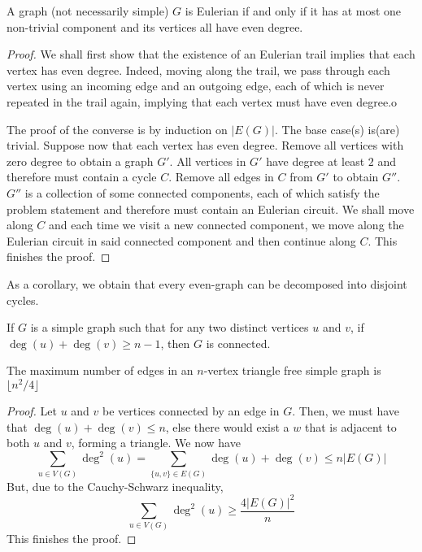 \begin{theorem}
    A graph (not necessarily simple) $G$ is Eulerian if and only if it has at most one non-trivial component and its vertices all have even degree.
\end{theorem}
\begin{proof}
    We shall first show that the existence of an Eulerian trail implies that each vertex has even degree. Indeed, moving along the trail, we pass through each vertex using an incoming edge and an outgoing edge, each of which is never repeated in the trail again, implying that each vertex must have even degree.o

    The proof of the converse is by induction on $|E(G)|$. The base case(s) is(are) trivial. Suppose now that each vertex has even degree. Remove all vertices with zero degree to obtain a graph $G'$. All vertices in $G'$ have degree at least $2$ and therefore must contain a cycle $C$. Remove all edges in $C$ from $G'$ to obtain $G''$. $G''$ is a collection of some connected components, each of which satisfy the problem statement and therefore must contain an Eulerian circuit. We shall move along $C$ and each time we visit a new connected component, we move along the Eulerian circuit in said connected component and then continue along $C$. This finishes the proof.
\end{proof}

As a corollary, we obtain that every even-graph can be decomposed into disjoint cycles.

\begin{lemma}
    If $G$ is a simple graph such that for any two distinct vertices $u$ and $v$, if $\deg(u) + \deg(v)\ge n - 1$, then $G$ is connected.
\end{lemma}

\begin{theorem}[Mantel, 1907]
    The maximum number of edges in an $n$-vertex triangle free simple graph is $\lfloor n^2/4\rfloor$
\end{theorem}
\begin{proof}
    Let $u$ and $v$ be vertices connected by an edge in $G$. Then, we must have that $\deg(u) + \deg(v)\le n$, else there would exist a $w$ that is adjacent to both $u$ and $v$, forming a triangle. We now have 
    \begin{equation*}
        \sum_{u\in V(G)}\deg^2(u) = \sum_{\{u,v\}\in E(G)}\deg(u) + \deg(v) \le n|E(G)|
    \end{equation*}
    But, due to the Cauchy-Schwarz inequality, 
    \begin{equation*}
        \sum_{u\in V(G)}\deg^2(u) \ge \frac{4|E(G)|^2}{n}
    \end{equation*}
    This finishes the proof.
\end{proof}

